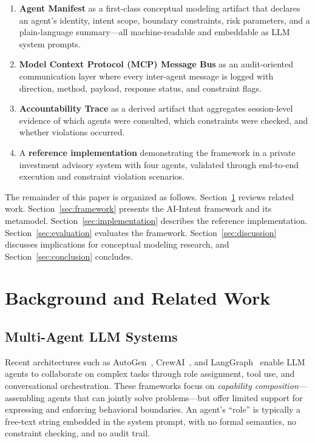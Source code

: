 \documentclass[runningheads]{llncs}
\begin{document}
\begin{enumerate}
    \item \textbf{Agent Manifest} as a first-class conceptual modeling artifact that declares an agent's identity, intent scope, boundary constraints, risk parameters, and a plain-language summary---all machine-readable and embeddable as LLM system prompts.
    \item \textbf{Model Context Protocol (MCP) Message Bus} as an audit-oriented communication layer where every inter-agent message is logged with direction, method, payload, response status, and constraint flags.
    \item \textbf{Accountability Trace} as a derived artifact that aggregates session-level evidence of which agents were consulted, which constraints were checked, and whether violations occurred.
    \item A \textbf{reference implementation} demonstrating the framework in a private investment advisory system with four agents, validated through end-to-end execution and constraint violation scenarios.
\end{enumerate}

The remainder of this paper is organized as follows. Section~\ref{sec:background} reviews related work. Section~\ref{sec:framework} presents the AI-Intent framework and its metamodel. Section~\ref{sec:implementation} describes the reference implementation. Section~\ref{sec:evaluation} evaluates the framework. Section~\ref{sec:discussion} discusses implications for conceptual modeling research, and Section~\ref{sec:conclusion} concludes.

\section{Background and Related Work}
\label{sec:background}

\subsection{Multi-Agent LLM Systems}

Recent architectures such as AutoGen~\cite{wu2023autogen}, CrewAI~\cite{crewai2024}, and LangGraph~\cite{langgraph2024} enable LLM agents to collaborate on complex tasks through role assignment, tool use, and conversational orchestration. These frameworks focus on \emph{capability composition}---assembling agents that can jointly solve problems---but offer limited support for expressing and enforcing behavioral boundaries. An agent's ``role'' is typically a free-text string embedded in the system prompt, with no formal semantics, no constraint checking, and no audit trail.
\end{document}

